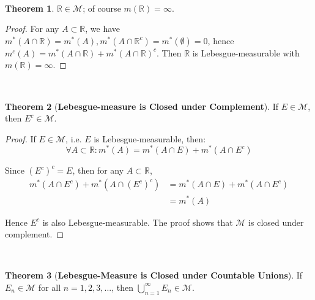 \documentclass[reqno]{amsart}
\theoremstyle{definition}
\newtheorem{theorem}{Theorem}
\begin{document}
~\\
\begin{theorem}
$\mathbb{R} \in \mathcal{M}$; of course $m(\mathbb{R}) = \infty$.
\end{theorem}

\begin{proof}
For any $A \subset \mathbb{R}$, we have $m^{*}(A \cap \mathbb{R}) = m^{*}(A), m^{*}(A \cap \mathbb{R}^{c}) = m^{*}(\emptyset) = 0$, hence $m^{c}(A) = m^{*}(A \cap \mathbb{R}) + m^{*}(A \cap \mathbb{R})^{c}$. Then $\mathbb{R}$ is Lebesgue-measurable with $m(\mathbb{R}) = \infty$.
\end{proof}
~\\
\begin{theorem}[\textbf{Lebesgue-measure is Closed under Complement}]{\mbox{}}
If $E \in \mathcal{M}$, then $E^{c} \in \mathcal{M}$.
\end{theorem}

\begin{proof}
If  $E \in \mathcal{M}$, i.e. $E$ is Lebesgue-measurable, then:
$$
\forall A \subset \mathbb{R}: m^{*}(A) = m^{*}(A \cap E) + m^{*}(A \cap E^{c})
$$

Since $(E^{c})^{c} = E$, then for any $A \subset \mathbb{R}$,
\begin{align*}
m^{*}(A \cap E^{c}) + m^{*}\left(A \cap (E^{c})^{c}\right) & = m^{*}(A \cap E) + m^{*}(A \cap E^{c})\\
& = m^{*}(A)
\end{align*}

Hence $E^{c}$ is also Lebesgue-measurable. The proof shows that $\mathcal{M}$ is closed under complement.
\end{proof}
~\\
\begin{theorem}[\textbf{Lebesgue-Measure is Closed under Countable Unions}]{\mbox{}}

If $E_{n} \in \mathcal{M}$ for all $n = 1, 2, 3, ...$, then $\bigcup\limits^{\infty}_{n=1}E_{n} \in \mathcal{M}$.
\end{theorem}
\end{document}

